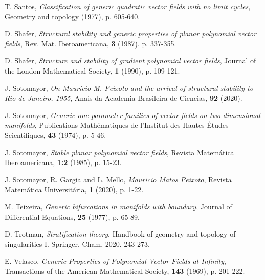 \documentclass[11pt]{amsart}
\begin{document}
\begin{thebibliography}{99}
{\sc T. Santos}, 
{\it Classification of generic quadratic vector fields with no limit cycles},
Geometry and topology (1977), p. 605-640.
	
{\sc D. Shafer}, 
{\it Structural stability and generic properties of planar polynomial vector fields},
Rev. Mat. Iberoamericana, \textbf{3} (1987), p. 337-355.
	
{\sc D. Shafer}, 
{\it Structure and stability of gradient polynomial vector fields},
Journal of the London Mathematical Society, \textbf{1} (1990), p. 109-121.

{\sc J. Sotomayor}, 
{\it On Maurício M. Peixoto and the arrival of structural stability to Rio de Janeiro, 1955},
Anais da Academia Brasileira de Ciencias, \textbf{92} (2020).
	
{\sc J. Sotomayor}, 
{\it Generic one-parameter families of vector fields on two-dimensional manifolds},
Publications Mathématiques de l'Institut des Hautes Études Scientifiques, \textbf{43} (1974), p. 5-46.
	
{\sc J. Sotomayor}, 
{\it Stable planar polynomial vector fields},
Revista Matemática Iberoamericana, \textbf{1:2} (1985), p. 15-23.
	
{\sc J. Sotomayor, R. Gargia and L. Mello}, 
{\it Mauricio Matos Peixoto},
Revista Matemática Universitária, \textbf{1} (2020), p. 1-22.
	
{\sc M. Teixeira}, 
{\it Generic bifurcations in manifolds with boundary},
Journal of Differential Equations, \textbf{25} (1977), p. 65-89.
	
{\sc D. Trotman}, 
{\it Stratification theory},
Handbook of geometry and topology of singularities I. Springer, Cham, 2020. 243-273.
	
{\sc E. Velasco}, 
{\it Generic Properties of Polynomial Vector Fields at Infinity},
Transactions of the American Mathematical Society, \textbf{143} (1969), p. 201-222.
	
\end{thebibliography}
\end{document}
